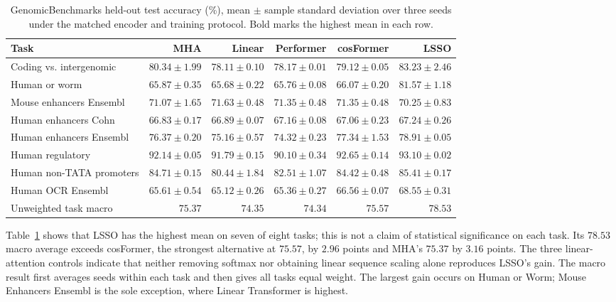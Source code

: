 \documentclass[10pt]{article}
\begin{document}
\begin{table}[H]
\centering
\footnotesize
\setlength{\tabcolsep}{3.2pt}
\caption{GenomicBenchmarks held-out test accuracy (\%), mean $\pm$ sample
standard deviation over three seeds under the matched encoder and training
protocol.  Bold marks the highest mean in each row.}
\label{tab:genomic-results}
\begin{tabular}{lrrrrr}
\toprule
Task & MHA & Linear & Performer & cosFormer & LSSO \\
\midrule
Coding vs. intergenomic  & $80.34\pm1.99$ & $78.11\pm0.10$ & $78.17\pm0.01$ & $79.12\pm0.05$ & $\boldsymbol{83.23\pm2.46}$ \\
Human or worm            & $65.87\pm0.35$ & $65.68\pm0.22$ & $65.76\pm0.08$ & $66.07\pm0.20$ & $\boldsymbol{81.57\pm1.18}$ \\
Mouse enhancers Ensembl  & $71.07\pm1.65$ & $\boldsymbol{71.63\pm0.48}$ & $71.35\pm0.48$ & $71.35\pm0.48$ & $70.25\pm0.83$ \\
Human enhancers Cohn     & $66.83\pm0.17$ & $66.89\pm0.07$ & $67.16\pm0.08$ & $67.06\pm0.23$ & $\boldsymbol{67.24\pm0.26}$ \\
Human enhancers Ensembl  & $76.37\pm0.20$ & $75.16\pm0.57$ & $74.32\pm0.23$ & $77.34\pm1.53$ & $\boldsymbol{78.91\pm0.05}$ \\
Human regulatory         & $92.14\pm0.05$ & $91.79\pm0.15$ & $90.10\pm0.34$ & $92.65\pm0.14$ & $\boldsymbol{93.10\pm0.02}$ \\
Human non-TATA promoters & $84.71\pm0.15$ & $80.44\pm1.84$ & $82.51\pm1.07$ & $84.42\pm0.48$ & $\boldsymbol{85.41\pm0.17}$ \\
Human OCR Ensembl        & $65.61\pm0.54$ & $65.12\pm0.26$ & $65.36\pm0.27$ & $66.56\pm0.07$ & $\boldsymbol{68.55\pm0.31}$ \\
\midrule
Unweighted task macro    & $75.37$ & $74.35$ & $74.34$ & $75.57$ & $\mathbf{78.53}$ \\
\bottomrule
\end{tabular}
\end{table}

Table~\ref{tab:genomic-results} shows that LSSO has the highest mean on
seven of eight tasks; this is not a claim of statistical significance on each task.  Its $78.53$ macro average exceeds cosFormer, the strongest alternative
at $75.57$, by $2.96$ points and MHA's $75.37$ by $3.16$ points.  The three
linear-attention controls indicate that neither removing softmax nor obtaining
linear sequence scaling alone reproduces LSSO's gain.  The macro result first
averages seeds within each task and then gives all tasks equal weight.  The
largest gain occurs on Human or Worm; Mouse Enhancers Ensembl is the sole
exception, where Linear Transformer is highest.
\end{document}
